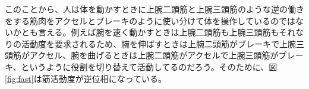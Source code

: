 \documentclass{jsarticle}
\begin{document}
このことから、人は体を動かすときに上腕二頭筋と上腕三頭筋のような逆の働きをする筋肉をアクセルとブレーキのように使い分けて体を操作しているのではないかとも言える。例えば腕を速く動かすときは上腕二頭筋も上腕三頭筋もそれなりの活動度を要求されるため、腕を伸ばすときは上腕二頭筋がブレーキで上腕三頭筋がアクセル、腕を曲げるときは上腕二頭筋がアクセルで上腕三頭筋がブレーキ、というように役割を切り替えて活動してるのだろう。そのために、図\ref{fig:fast}は筋活動度が逆位相になっている。
\end{document}
